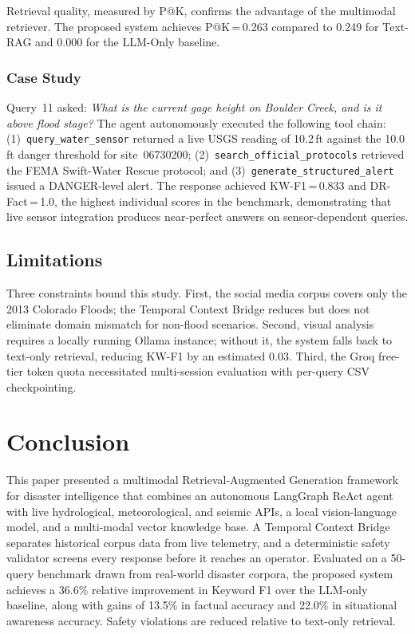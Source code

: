 Retrieval quality, measured by P@K, confirms the advantage of the multimodal
retriever. The proposed system achieves P@K\,=\,0.263 compared to 0.249 for
Text-RAG and 0.000 for the LLM-Only baseline.

\subsubsection{Case Study}
Query~11 asked: \textit{What is the current gage height on Boulder Creek, and
is it above flood stage?} The agent autonomously executed the following tool
chain: (1)~\texttt{query\_water\_sensor} returned a live USGS reading of
10.2\,ft against the 10.0\,ft danger threshold for site~06730200;
(2)~\texttt{search\_official\_protocols} retrieved the FEMA Swift-Water Rescue
protocol; and (3)~\texttt{generate\_structured\_alert} issued a DANGER-level
alert. The response achieved KW-F1\,=\,0.833 and DR-Fact\,=\,1.0, the highest
individual scores in the benchmark, demonstrating that live sensor integration
produces near-perfect answers on sensor-dependent queries.

\subsection{Limitations}
Three constraints bound this study. First, the social media corpus covers only
the 2013 Colorado Floods; the Temporal Context Bridge reduces but does not
eliminate domain mismatch for non-flood scenarios. Second, visual analysis
requires a locally running Ollama instance; without it, the system falls back
to text-only retrieval, reducing KW-F1 by an estimated 0.03. Third, the Groq
free-tier token quota necessitated multi-session evaluation with per-query CSV
checkpointing.

\section{Conclusion}

This paper presented a multimodal Retrieval-Augmented Generation framework for
disaster intelligence that combines an autonomous LangGraph ReAct agent with
live hydrological, meteorological, and seismic APIs, a local vision-language
model, and a multi-modal vector knowledge base. A Temporal Context Bridge
separates historical corpus data from live telemetry, and a deterministic
safety validator screens every response before it reaches an operator. Evaluated
on a 50-query benchmark drawn from real-world disaster corpora, the proposed
system achieves a 36.6\% relative improvement in Keyword F1 over the
LLM-only baseline, along with gains of 13.5\% in factual accuracy and 22.0\%
in situational awareness accuracy. Safety violations are reduced relative to
text-only retrieval.

